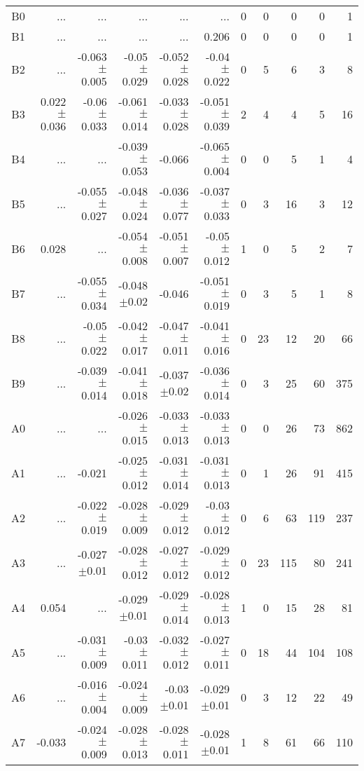 \begin{table}[t]
\begin{table}[t]
\begin{center}
\begin{tabular}{c|rrrrr|rrrrr}
    B0	&	 ...	&	 ...	&	 ...	&	 ...	&	 ...	&	0	&	0	&	0	&	0	&	1	\\
    B1	&	 ...	&	 ...	&	 ...	&	 ...	&	0.206	&	0	&	0	&	0	&	0	&	1	\\
    B2	&	 ...	&	-0.063$\pm$0.005	&	-0.05$\pm$0.029	&	-0.052$\pm$0.028	&	-0.04$\pm$0.022	&	0	&	5	&	6	&	3	&	8	\\
    B3	&	0.022$\pm$0.036	&	-0.06$\pm$0.033	&	-0.061$\pm$0.014	&	-0.033$\pm$0.028	&	-0.051$\pm$0.039	&	2	&	4	&	4	&	5	&	16	\\
    B4	&	 ...	&	 ...	&	-0.039$\pm$0.053	&	-0.066	&	-0.065$\pm$0.004	&	0	&	0	&	5	&	1	&	4	\\
    B5	&	 ...	&	-0.055$\pm$0.027	&	-0.048$\pm$0.024	&	-0.036$\pm$0.077	&	-0.037$\pm$0.033	&	0	&	3	&	16	&	3	&	12	\\
    B6	&	0.028	&	 ...	&	-0.054$\pm$0.008	&	-0.051$\pm$0.007	&	-0.05$\pm$0.012	&	1	&	0	&	5	&	2	&	7	\\
    B7	&	 ...	&	-0.055$\pm$0.034	&	-0.048$\pm$0.02	&	-0.046	&	-0.051$\pm$0.019	&	0	&	3	&	5	&	1	&	8	\\
    B8	&	 ...	&	-0.05$\pm$0.022	&	-0.042$\pm$0.017	&	-0.047$\pm$0.011	&	-0.041$\pm$0.016	&	0	&	23	&	12	&	20	&	66	\\
    B9	&	 ...	&	-0.039$\pm$0.014	&	-0.041$\pm$0.018	&	-0.037$\pm$0.02	&	-0.036$\pm$0.014	&	0	&	3	&	25	&	60	&	375	\\
    A0	&	 ...	&	 ...	&	-0.026$\pm$0.015	&	-0.033$\pm$0.013	&	-0.033$\pm$0.013	&	0	&	0	&	26	&	73	&	862	\\
    A1	&	 ...	&	-0.021	&	-0.025$\pm$0.012	&	-0.031$\pm$0.014	&	-0.031$\pm$0.013	&	0	&	1	&	26	&	91	&	415	\\
    A2	&	 ...	&	-0.022$\pm$0.019	&	-0.028$\pm$0.009	&	-0.029$\pm$0.012	&	-0.03$\pm$0.012	&	0	&	6	&	63	&	119	&	237	\\
    A3	&	 ...	&	-0.027$\pm$0.01	&	-0.028$\pm$0.012	&	-0.027$\pm$0.012	&	-0.029$\pm$0.012	&	0	&	23	&	115	&	80	&	241	\\
    A4	&	0.054	&	 ...	&	-0.029$\pm$0.01	&	-0.029$\pm$0.014	&	-0.028$\pm$0.013	&	1	&	0	&	15	&	28	&	81	\\
    A5	&	 ...	&	-0.031$\pm$0.009	&	-0.03$\pm$0.011	&	-0.032$\pm$0.012	&	-0.027$\pm$0.011	&	0	&	18	&	44	&	104	&	108	\\
    A6	&	 ...	&	-0.016$\pm$0.004	&	-0.024$\pm$0.009	&	-0.03$\pm$0.01	&	-0.029$\pm$0.01	&	0	&	3	&	12	&	22	&	49	\\
    A7	&	-0.033	&	-0.024$\pm$0.009	&	-0.028$\pm$0.013	&	-0.028$\pm$0.011	&	-0.028$\pm$0.01	&	1	&	8	&	61	&	66	&	110	\\

\end{tabular}
\end{center}
\end{table}
\end{table}
